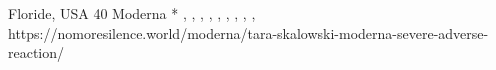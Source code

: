          {Floride, USA}
          {40}
          {Moderna}
          {*}
          {,
           ,
           ,
           ,
           ,
           ,
           ,
           ,
           ,
          }
          {https://nomoresilence.world/moderna/tara-skalowski-moderna-severe-adverse-reaction/}

